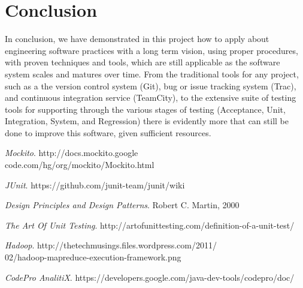 \documentclass[11pt,twocolumn]{article} %
\begin{document}
\section{Conclusion}
In conclusion, we have demonstrated in this project how to apply about engineering software practices
with a long term vision, using proper procedures, with proven techniques and tools, which
are still applicable as the software system scales and matures over time.
From the traditional tools for any project, such as a the version control system (Git), bug
or issue tracking system (Trac), and continuous integration service (TeamCity), to
the extensive suite of testing tools for supporting through the various stages of testing (Acceptance, 
Unit, Integration, System, and Regression) there is evidently more
that can still be done to improve this software, given sufficient resources.

\begin{thebibliography}{9}
  \emph{Mockito}.
  http://docs.mockito.google\\code.com/hg/org/mockito/Mockito.html  

  \emph{JUnit}.
  https://github.com/junit-team/junit/wiki

  \emph{Design Principles and Design Patterns}.
  Robert C. Martin,
  2000

  \emph{The Art Of Unit Testing}.
  http://artofunittesting.com/definition-of-a-unit-test/

  \emph{Hadoop}.
  http://thetechmusings.files.wordpress.com/2011/\\02/hadoop-mapreduce-execution-framework.png
  
  \emph{CodePro AnalitiX}.
  https://developers.google.com/java-dev-tools/codepro/doc/ 
  
\end{thebibliography}
\end{document}
